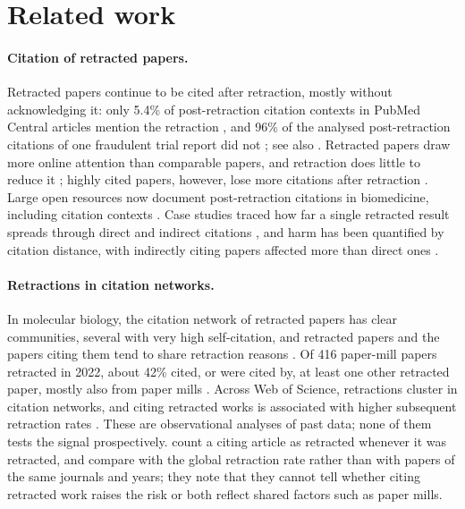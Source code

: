 \documentclass[pdflatex,sn-basic]{sn-jnl}
\begin{document}
\section{Related work}\label{sec:related}

\paragraph{Citation of retracted papers.} Retracted papers continue to be cited after retraction, mostly without
acknowledging it: only 5.4\% of post-retraction citation contexts in PubMed Central articles mention the retraction
\citep{hsiao2021continued}, and 96\% of the analysed post-retraction citations of one fraudulent trial report did not
\citep{schneider2020continued}; see also \citet{teixeira2025citation}. Retracted papers draw more online attention than
comparable papers, and retraction does little to reduce it \citep{peng2022attention}; highly cited papers, however,
lose more citations after retraction \citep{memon2025widely}. Large open resources now document post-retraction
citations in biomedicine, including citation contexts \citep{hsiao2021continued,joseph2026sanecite}. Case studies
traced how far a single retracted result spreads through direct and indirect citations
\citep{vandervet2016propagation}, and harm has been quantified by citation distance, with indirectly citing papers
affected more than direct ones \citep{harm2025dynamics}.

\paragraph{Retractions in citation networks.} In molecular biology, the citation network of retracted papers has clear
communities, several with very high self-citation, and retracted papers and the papers citing them tend to share
retraction reasons \citep{feng2024molbio}. Of 416 paper-mill papers retracted in 2022, about 42\% cited, or were cited
by, at least one other retracted paper, mostly also from paper mills \citep{candal2024references}. Across Web of
Science, retractions cluster in citation networks, and citing retracted works is associated with higher subsequent
retraction rates \citep{lou2026beyond}. These are observational analyses of past data; none of them tests the signal
prospectively. \citet{lou2026beyond} count a citing article as retracted whenever it was retracted, and compare
with the global retraction rate rather than with papers of the same journals and years; they note that they cannot
tell whether citing retracted work raises the risk or both reflect shared factors such as paper mills.
\end{document}
